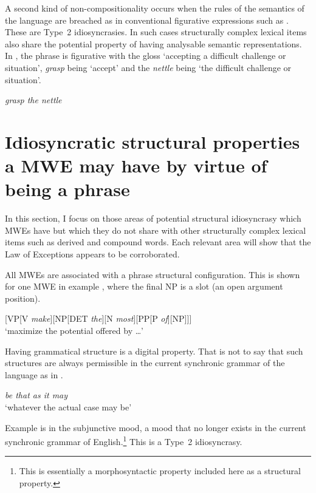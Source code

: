 \documentclass[output=paper]{langsci/langscibook}
\begin{document}
A second kind of non-compositionality occurs when the rules of the semantics of the language are breached as in conventional figurative expressions such as . These are Type~2 idiosyncrasies. In such cases structurally complex lexical items also share the potential property of having analysable semantic representations. In , the phrase is figurative with the gloss ‘accepting a difficult challenge or situation’, \textit{grasp} being ‘accept’ and the \textit{nettle} being ‘the difficult challenge or situation’.

\begin{exe}
\ex\label{ex:ex24}    \textit{grasp the nettle}
\end{exe}
 

\section{Idiosyncratic structural properties a MWE may have by virtue of being a phrase}

In this section, %
I focus on those areas of potential structural idiosyncrasy which MWEs have but which they do not 
share with other structurally complex lexical items such as derived and compound words. Each 
relevant area will show that the Law of Exceptions appears to be corroborated. 


All MWEs are associated with a phrase structural configuration. This is shown for one MWE in example , where the final NP is a slot (an open argument position).

\begin{exe}
\ex\label{ex:ex25}   [VP[V \textit{make}][NP[DET \textit{the}][N \textit{most}][PP[P \textit{of}][NP]]] \\
‘maximize the potential offered by \ldots’ 
\end{exe}


Having grammatical structure is a digital property. That is not 
to say that such structures are always permissible in the 
current synchronic grammar of the language as in
.

\begin{exe}
\ex\label{ex:ex26} \textit{be that as it may}\\
‘whatever the actual case may be’
\end{exe}


Example  is in the subjunctive mood, a mood that no longer exists in the current synchronic grammar of  English.\footnote{This is essentially a morphosyntactic property included here as a structural property.} This is a Type~2 idiosyncrasy.
\end{document}
